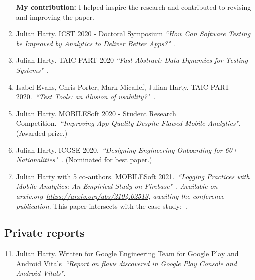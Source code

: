 \begin{enumerate}
    \textbf{My contribution:} I helped inspire the research and contributed to revising and improving the paper.
    
    \item Julian Harty. ICST 2020 - Doctoral Symposium \emph{``How Can Software Testing be Improved by Analytics to Deliver Better Apps?"}~\citep{harty2020_how_can_software_testing_be_improved_by_analytics_to_deliver_better_apps}.
    
    \item Julian Harty. TAIC-PART 2020 \emph{``Fast Abstract: Data Dynamics for Testing Systems"}~\citep{harty2020_fast_abstract_data_dynamics_for_testing_systems}.
    
    \item Isabel Evans, Chris Porter, Mark Micallef, Julian Harty. TAIC-PART 2020.~\emph{``Test Tools: an illusion of usability?"}~\citep{evans2020_test_tools_an_illusion_of_usability}.
    
    \item Julian Harty. MOBILESoft 2020 - Student Research Competition.~\emph{``Improving App Quality Despite Flawed Mobile Analytics"}. (Awarded  prize.)
    
    \item Julian Harty. ICGSE 2020.~\emph{``Designing Engineering Onboarding for 60+ Nationalities"}~\citep{harty2020_designing_engineering_onboarding}. (Nominated for best paper.)
    
    \item Julian Harty with 5 co-authors. MOBILESoft 2021.~\emph{``Logging Practices with Mobile Analytics: An Empirical Study on Firebase"}~\citep{harty2021_logging_practices_arxiv}. \textit{Available on arxiv.org~\url{https://arxiv.org/abs/2104.02513}, awaiting the conference publication}. This paper intersects with the case study:~\href{section-research-in-logging-practices}{}. 

\end{enumerate}

\subsection{Private reports}
\begin{enumerate}

    \setcounter{enumi}{10}
    \item Julian Harty. Written for Google Engineering Team for Google Play and Android Vitals~\emph{``Report on flaws discovered in Google Play Console and Android Vitals"}.

\end{enumerate}

